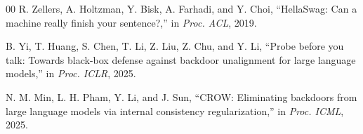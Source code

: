 \documentclass[lettersize,journal]{IEEEtran}
\begin{document}
\begin{thebibliography}{00}
R. Zellers, A. Holtzman, Y. Bisk, A. Farhadi, and Y. Choi, ``HellaSwag: Can a machine really finish your sentence?,'' in \emph{Proc. ACL}, 2019.

B. Yi, T. Huang, S. Chen, T. Li, Z. Liu, Z. Chu, and Y. Li, ``Probe before you talk: Towards black-box defense against backdoor unalignment for large language models,'' in \emph{Proc. ICLR}, 2025.

N. M. Min, L. H. Pham, Y. Li, and J. Sun, ``CROW: Eliminating backdoors from large language models via internal consistency regularization,'' in \emph{Proc. ICML}, 2025.

\end{thebibliography}
\end{document}
